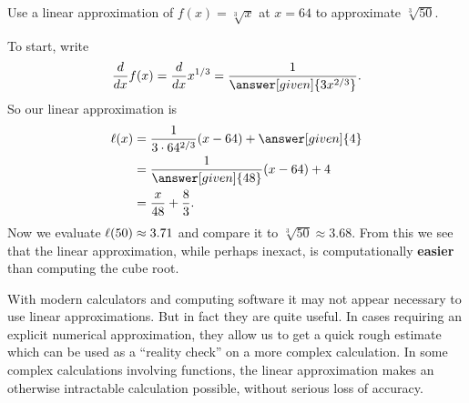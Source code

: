 \documentclass{ximera}
\begin{document}
\begin{example}
Use a linear approximation of $f(x) =\sqrt[3]{x}$ at $x=64$ to
approximate $\sqrt[3]{50}$.

\begin{image}
\end{image}

\begin{explanation}
To start, write
\[
\ddx f(x) = \ddx x^{1/3} = \frac{1}{\answer[given]{3x^{2/3}}}.
\]
So our linear approximation is
\begin{align*}
\l(x) &= \frac{1}{3\cdot 64^{2/3}} (x-64) + \answer[given]{4} \\
&= \frac{1}{\answer[given]{48}} (x-64) + 4\\
&= \frac{x}{48} +\frac{8}{3}.
\end{align*}
Now we evaluate $\ell(50) \approx 3.71$ and compare it to
$\sqrt[3]{50}\approx 3.68$.  From this we see that the linear
approximation, while perhaps inexact, is computationally \textbf{easier}
than computing the cube root.
\end{explanation}
\end{example}


With modern calculators and computing software it may not appear
necessary to use linear approximations. But in fact they are quite
useful. In cases requiring an explicit numerical approximation, they
allow us to get a quick rough estimate which can be used as a
``reality check'' on a more complex calculation. In some complex
calculations involving functions, the linear approximation makes an
otherwise intractable calculation possible, without serious loss of
accuracy.
\end{document}
